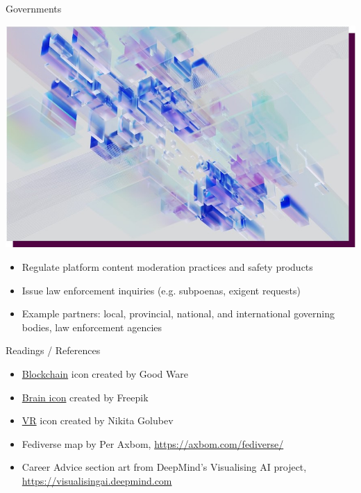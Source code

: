 \documentclass[nobackground,dvipsnames,table]{beamer}
\begin{document}
\begin{frame}{Governments}

\begin{center}
    \includegraphics[width=.7\textwidth]{img/fig17.jpg}
\end{center}

\small{
    \begin{itemize} 
        \item Regulate platform content moderation practices and safety   products
        \item Issue law enforcement inquiries (e.g. subpoenas, exigent requests)
        \item Example partners: local, provincial, national, and international governing bodies, law enforcement agencies
    \end{itemize}
}
\end{frame}





\begin{frame}{Readings / References}

\begin{itemize}
    \item \href{https://www.flaticon.com/free-icons/blockchain}{Blockchain} icon created by Good Ware
    \item \href{https://www.flaticon.com/free-icons/brain}{Brain icon} created by Freepik 
    \item \href{https://www.flaticon.com/free-icons/vr}{VR} icon created by Nikita Golubev
    \item Fediverse map by Per Axbom, \url{https://axbom.com/fediverse/}
    \item Career Advice section art from DeepMind’s Visualising AI project, \url{https://visualisingai.deepmind.com}
\end{itemize}

\end{frame}
\end{document}
